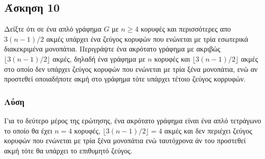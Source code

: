 \subsection*{Άσκηση 10}

Δείξτε ότι σε ένα απλό γράφημα $G$ με $n \ge 4$ κορυφές και περισσότερες απο $3(n-1)/2$ ακμές υπάρχει ένα ζεύγος κορυφών που ενώνεται με τρία εσωτερικά διακεκριμένα
μονοπάτια. Περιγράψτε ένα ακρότατο γράφημα με ακριβώς $\lfloor 3(n-1)/2 \rfloor$ ακμές, δηλαδή ένα γράφημα με $n$ κορυφές και $\lfloor 3(n-1)/2 \rfloor$ ακμές στο οποίο
δεν υπάρχει ζεύγος κορυφών που ενώνεται με τρία ξένα μονοπάτια, ενώ αν προστεθεί οποιαδήποτε ακμή στο γράφημα τότε υπάρχει τέτοιο ζεύγος κορρυφών.

\subsubsection*{Λύση}

Για το δεύτερο μέρος της ερώτησης, ένα ακρότατο γράφημα είναι ένα απλό τετράγωνο το οποίο θα έχει $n=4$ κορυφές, $\lfloor 3(n-1)/2 \rfloor = 4$ ακμές και δεν περιέχει ζεύγος
κορυφών που ενώνεται με τρία ξένα μονοπάτια ενώ ταυτόχρονα άν του προστεθεί ακμή τότε θα υπάρχει το επιθυμητό ζεύγος.
